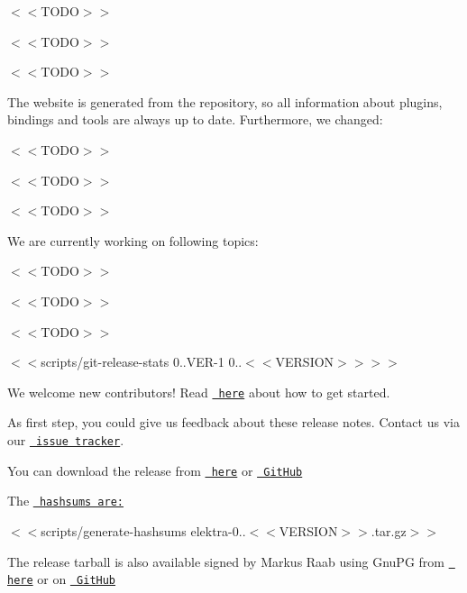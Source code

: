 \begin{DoxyItemize}
\item $<$$<$\+T\+O\+D\+O$>$$>$
\item $<$$<$\+T\+O\+D\+O$>$$>$
\item $<$$<$\+T\+O\+D\+O$>$$>$
\end{DoxyItemize}

The website is generated from the repository, so all information about plugins, bindings and tools are always up to date. Furthermore, we changed\+:


\begin{DoxyItemize}
\item $<$$<$\+T\+O\+D\+O$>$$>$
\item $<$$<$\+T\+O\+D\+O$>$$>$
\item $<$$<$\+T\+O\+D\+O$>$$>$
\end{DoxyItemize}

We are currently working on following topics\+:


\begin{DoxyItemize}
\item $<$$<$\+T\+O\+D\+O$>$$>$
\item $<$$<$\+T\+O\+D\+O$>$$>$
\item $<$$<$\+T\+O\+D\+O$>$$>$
\end{DoxyItemize}

$<$$<${\ttfamily scripts/git-\/release-\/stats 0..\+V\+ER-\/1 0..$<$$<$V\+E\+R\+S\+I\+ON$>$$>$}$>$$>$

We welcome new contributors! Read \href{https://www.libelektra.org/devgettingstarted/ideas}{\texttt{ here}} about how to get started.

As first step, you could give us feedback about these release notes. Contact us via our \href{https://issues.libelektra.org}{\texttt{ issue tracker}}.

You can download the release from \href{https://www.libelektra.org/ftp/elektra/releases/elektra-0.9.<<VERSION>>.tar.gz}{\texttt{ here}} or \href{https://github.com/ElektraInitiative/ftp/blob/master/releases/elektra-0.9.<<VERSION>>.tar.gz?raw=true}{\texttt{ Git\+Hub}}

The \href{https://github.com/ElektraInitiative/ftp/blob/master/releases/elektra-0.9.<<VERSION>>.tar.gz.hashsum?raw=true}{\texttt{ hashsums are\+:}}

$<$$<${\ttfamily scripts/generate-\/hashsums elektra-\/0..$<$$<$V\+E\+R\+S\+I\+ON$>$$>$.tar.\+gz}$>$$>$

The release tarball is also available signed by Markus Raab using Gnu\+PG from \href{https://www.libelektra.org/ftp/elektra/releases/elektra-0.9.<<VERSION>>.tar.gz.gpg}{\texttt{ here}} or on \href{https://github.com/ElektraInitiative/ftp/blob/master/releases/elektra-0.9.<<VERSION>>.tar.gz.gpg?raw=true}{\texttt{ Git\+Hub}}

